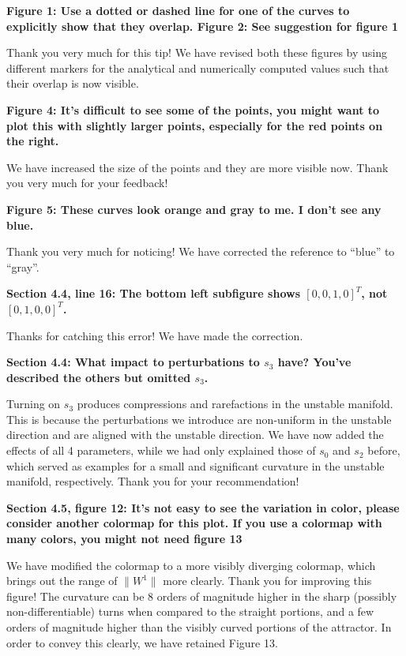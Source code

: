 \documentclass[11pt]{article}
\newcommand{\reviewerOne}[1]{{\color{burgundy}\textbf{#1}}}
\begin{document}
\reviewerOne{Figure 1: Use a dotted or dashed line for one of the curves to explicitly show that they overlap.
Figure 2: See suggestion for figure 1}

Thank you very much for this tip! We have revised both these figures by using different markers for the analytical and numerically computed values such that their overlap is now visible. 

\reviewerOne{Figure 4: It's difficult to see some of the points, you might want to plot this with slightly larger points, especially
for the red points on the right.}

We have increased the size of the points and they are more visible now. Thank you very much for your feedback! 

\reviewerOne{Figure 5: These curves look orange and gray to me. I don't see any blue.}

Thank you very much for noticing! We have corrected the reference to ``blue'' to ``gray''.

\reviewerOne{Section 4.4, line 16: The bottom left subfigure shows $[0,0,1,0]^T$, not $[0,1,0,0]^T$.}

Thanks for catching this error! We have made the correction.

\reviewerOne{Section 4.4: What impact to perturbations to $s_3$ have? You've described the others but omitted $s_3$.}

Turning on $s_3$ produces compressions and rarefactions in the unstable manifold. This is because the perturbations we introduce are non-uniform in the unstable direction and are aligned with the unstable direction. We have now added the effects of all 4 parameters, while we had only explained those of $s_0$ and $s_2$ before, which served as examples for a small and significant curvature in the unstable manifold, respectively. Thank you for your recommendation!

\reviewerOne{Section 4.5, figure 12: It's not easy to see the variation in color, please consider another colormap for this plot. If
you use a colormap with many colors, you might not need figure 13}

We have modified the colormap to a more visibly diverging colormap, which brings out the range of $\|W^1\|$ more clearly. Thank you for improving this figure! The curvature can be 8 orders of magnitude higher in the sharp (possibly non-differentiable) turns when compared to the straight portions, and a few orders of magnitude higher than the visibly curved portions of the attractor. In order to convey this clearly, we have retained Figure 13.
\end{document}
